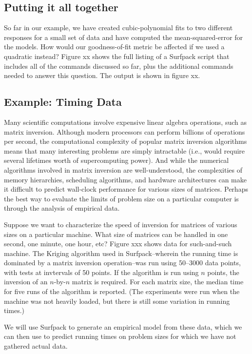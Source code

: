 \documentclass{article}
\begin{document}
\subsection{Putting it all together}
So far in our example, we have created cubic-polynomial fits to two different responses for a small set of data and have computed the mean-squared-error for the models.  How would our goodness-of-fit metric be affected if we used a quadratic instead?  Figure xx shows the full listing of a Surfpack script that includes all of the commands discussed so far, plus the additional commands needed to answer this question. The output is shown in figure xx.


\subsection{Example: Timing Data}
Many scientific computations involve expensive linear algebra operations, such as matrix inversion.  Although modern processors can perform billions of operations per second, the computational complexity of popular matrix inversion algorithms means that many interesting problems are simply intractable (i.e., would require several lifetimes worth of supercomputing power).  And while the numerical algorithms involved in matrix inversion are well-understood, the complexities of memory hierarchies, scheduling algorithms, and hardware architectures can make it difficult to predict wall-clock performance for various sizes of matrices.  Perhaps the best way to evaluate the limits of problem size on a particular computer is through the analysis of empirical data.

Suppose we want to characterize the speed of inversion for matrices of various sizes on a particular machine.  What size of matrices can be handled in one second, one minute, one hour, etc?  Figure xxx shows data for such-and-such machine.  The Kriging algorithm used in Surfpack--wherein the running time is dominated by a matrix inversion operation--was run using 50--3000 data points, with tests at invtervals of 50 points.  If the algorithm is run using $n$ points, the inversion of an $n$-by-$n$ matrix is required.  For each matrix size, the median time for five runs of the algorithm is reported.  (The experiments were run when the machine was not heavily loaded, but there is still some variation in running times.)

We will use Surfpack to generate an empirical model from these data, which we can then use to predict running times on problem sizes for which we have not gathered actual data.
\end{document}
